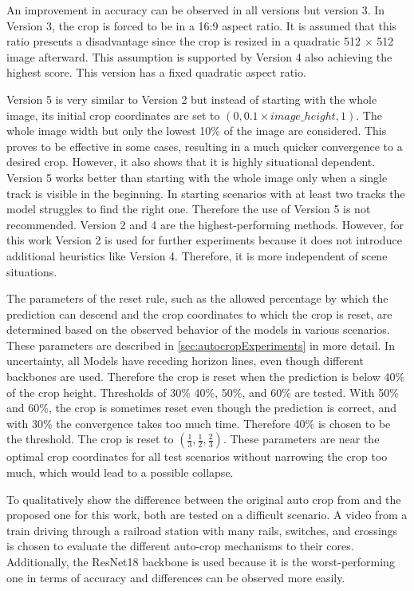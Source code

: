 An improvement in accuracy can be observed in all versions but version 3.
In Version 3, the crop is forced to be in a 16:9 aspect ratio.
It is assumed that this ratio presents a disadvantage since the crop is resized in a quadratic 512 $\times$ 512 image afterward.
This assumption is supported by Version 4 also achieving the highest score.
This version has a fixed quadratic aspect ratio.

Version 5 is very similar to Version 2 but instead of starting with the whole image, its initial crop coordinates are set to $(0, 0.1 \times image\_height, 1)$.
The whole image width but only the lowest 10\% of the image are considered.
This proves to be effective in some cases, resulting in a much quicker convergence to a desired crop.
However, it also shows that it is highly situational dependent.
Version 5 works better than starting with the whole image only when a single track is visible in the beginning.
In starting scenarios with at least two tracks the model struggles to find the right one. Therefore the use of Version 5 is not recommended.
Version 2 and 4 are the highest-performing methods.
However, for this work Version 2 is used for further experiments because it does not introduce additional heuristics like Version 4.
Therefore, it is more independent of scene situations.

The parameters of the reset rule, such as the allowed percentage by which the prediction can descend and the crop coordinates to which the crop is reset, are determined based on the observed behavior of the models in various scenarios.
These parameters are described in \autoref{sec:autocropExperiments} in more detail.
In uncertainty, all Models have receding horizon lines, even though different backbones are used.
Therefore the crop is reset when the prediction is below 40\% of the crop height.
Thresholds of 30\% 40\%, 50\%, and 60\% are tested.
With 50\% and 60\%, the crop is sometimes reset even though the prediction is correct, and with 30\% the convergence takes too much time.
Therefore 40\% is chosen to be the threshold.
The crop is reset to $(\frac{1}{3}, \frac{1}{2}, \frac{2}{3})$.
These parameters are near the optimal crop coordinates for all test scenarios without narrowing the crop too much, which would lead to a possible collapse.

\vspace{1cm}

To qualitatively show the difference between the original auto crop from \cite{tepNet2024} and the proposed one for this work, both are tested on a difficult scenario.
A video from a train driving through a railroad station with many rails, switches, and crossings is chosen to evaluate the different auto-crop mechanisms to their cores.
Additionally, the ResNet18 backbone is used because it is the worst-performing one in terms of accuracy and differences can be observed more easily.


